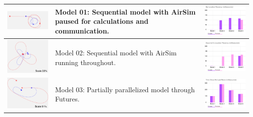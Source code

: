 \documentclass{article}
\begin{document}
\begin{table}[t]
	\centering
	\begin{tabular}{p{6.5cm}p{4cm}p{6.5cm} }
		
		\includegraphics[width=6cm]{model01-vpn}&Model 01: Sequential model with AirSim paused for calculations and communication.& \includegraphics[width=6cm]{my_location_vpn}\\\hline 
		\includegraphics[width=6cm]{model02-vpn}&Model 02: Sequential model with AirSim running throughout.&\includegraphics[width=6cm]{opp_location_vpn}\\			
		\hline
		\includegraphics[width=6cm]{model03-vpn}&Model 03: Partially parallelized model through Futures.&\includegraphics[width=6cm]{my_move_vpn}\\			

\end{tabular}
\end{table}
\end{document}
